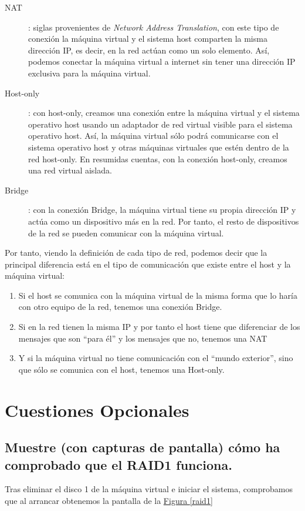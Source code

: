 \documentclass[10pt,a4paper,spanish]{article}
\numberwithin{equation}{section} %
\numberwithin{figure}{section} %
\numberwithin{table}{section} %
\begin{document}
\begin{description}
    \item[NAT]: siglas provenientes de \textit{Network Address Translation}, con este tipo de conexión la máquina virtual y el sistema host comparten la misma dirección IP, es decir, en la red actúan como un solo elemento. Así, podemos conectar la máquina virtual a internet sin tener una dirección IP exclusiva para la máquina virtual.

    \item[Host-only]: con host-only, creamos una conexión entre la máquina virtual y el sistema operativo host usando un adaptador de red virtual visible para el sistema operativo host. Así, la máquina virtual sólo podrá comunicarse con el sistema operativo host y otras máquinas virtuales que estén dentro de la red host-only. En resumidas cuentas, con la conexión host-only, creamos una red virtual aislada.

    \item[Bridge]: con la conexión Bridge, la máquina virtual tiene su propia dirección IP y actúa como un dispositivo más en la red. Por tanto, el resto de dispositivos de la red se pueden comunicar con la máquina virtual. 
\end{description}

Por tanto, viendo la definición de cada tipo de red, podemos decir que la principal diferencia está en el tipo de comunicación que existe entre el host y la máquina virtual:
\begin{enumerate}[---]
    \item Si el host se comunica con la máquina virtual de la misma forma que lo haría con otro equipo de la red, tenemos una conexión Bridge.
    \item Si en la red tienen la misma IP y por tanto el host tiene que diferenciar de los mensajes que son ``para él'' y los mensajes que no, tenemos una NAT
    \item Y si la máquina virtual no tiene comunicación con el ``mundo exterior'', sino que sólo se comunica con el host, tenemos una Host-only.
\end{enumerate}

\section{Cuestiones Opcionales}
\subsection{Muestre (con capturas de pantalla) cómo ha comprobado que el RAID1 funciona.}
Tras eliminar el disco 1 de la máquina virtual e iniciar el sistema, comprobamos que al arrancar obtenemos la pantalla de la \hyperref[raid1]{Figura \ref*{raid1}}
\end{document}
